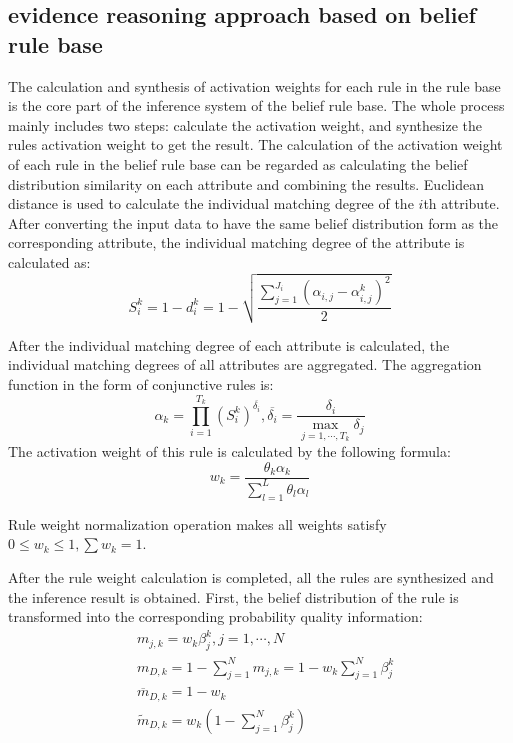 \documentclass{ieeeaccess}
\begin{document}
\subsection{evidence reasoning approach based on belief rule base}
The calculation and synthesis of activation weights for each rule in the rule base is the core part of the inference system of the belief rule base.
The whole process mainly includes two steps: calculate the activation weight, and synthesize the rules activation weight to get the result.
The calculation of the activation weight of each rule in the belief rule base can be regarded as calculating the belief distribution similarity on each attribute and combining the results.
Euclidean distance is used to calculate the individual matching degree of the $i$th attribute. After converting the input data to have the same belief distribution form as the corresponding attribute,
the individual matching degree of the attribute is calculated as:
\begin{equation}
    S_i^k=1-d_i^k=1-\sqrt{\frac{\sum_{j=1}^{J_i}(\alpha_{i,j}-\alpha_{i,j}^k)^2}{2}}
\end{equation}

After the individual matching degree of each attribute is calculated, the individual matching degrees of all attributes are aggregated. The aggregation function in the form of conjunctive rules is:
\begin{equation}
    \alpha_k=\prod_{i=1}^{T_k}(S_i^k)^{\overline{\delta_i}},\overline{\delta_i}=\frac{\delta_i}{\max_{j=1,\cdots,T_k}\delta_j}
\end{equation}
The activation weight of this rule is calculated by the following formula:
\begin{equation}
    w_k=\frac{\theta_k\alpha_k}{\sum_{l=1}^L\theta_l\alpha_l}
\end{equation}

Rule weight normalization operation makes all weights satisfy $0\leq w_k\leq 1,\sum w_k=1$.

After the rule weight calculation is completed, all the rules are synthesized and the inference result is obtained.
First, the belief distribution of the rule is transformed into the corresponding probability quality information:
\begin{align}
     & m_{j,k}=w_k\beta_j^k,j=1,\cdots,N                          \\
     & m_{D,k}=1-\sum_{j=1}^Nm_{j,k}=1-w_k\sum_{j=1}^{N}\beta_j^k \\
     & \overline{m}_{D,k}=1-w_k                                   \\
     & \widetilde{m}_{D,k}=w_k(1-\sum_{j=1}^N\beta_j^k)
\end{align}
\end{document}
